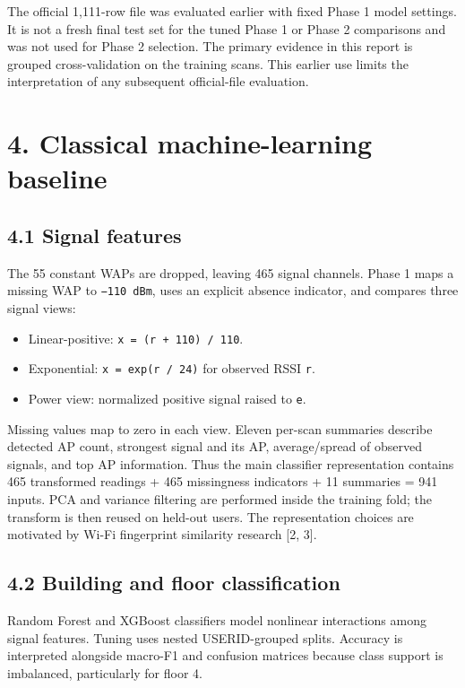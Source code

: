 \documentclass[
  10pt,
  a4paper,
]{article}
\providecommand{\tightlist}{%
  \setlength{\itemsep}{0pt}\setlength{\parskip}{0pt}}
\begin{document}
The official 1,111-row file was evaluated earlier with fixed Phase 1
model settings. It is not a fresh final test set for the tuned Phase 1
or Phase 2 comparisons and was not used for Phase 2 selection. The
primary evidence in this report is grouped cross-validation on the
training scans. This earlier use limits the interpretation of any
subsequent official-file evaluation.

\section{4. Classical machine-learning
baseline}\label{classical-machine-learning-baseline}

\subsection{4.1 Signal features}\label{signal-features}

The 55 constant WAPs are dropped, leaving 465 signal channels. Phase 1
maps a missing WAP to \texttt{−110\ dBm}, uses an explicit absence
indicator, and compares three signal views:

\begin{itemize}
\tightlist
\item
  Linear-positive: \texttt{x\ =\ (r\ +\ 110)\ /\ 110}.
\item
  Exponential: \texttt{x\ =\ exp(r\ /\ 24)} for observed RSSI
  \texttt{r}.
\item
  Power view: normalized positive signal raised to \texttt{e}.
\end{itemize}

Missing values map to zero in each view. Eleven per-scan summaries
describe detected AP count, strongest signal and its AP, average/spread
of observed signals, and top AP information. Thus the main classifier
representation contains 465 transformed readings + 465 missingness
indicators + 11 summaries = 941 inputs. PCA and variance filtering are
performed inside the training fold; the transform is then reused on
held-out users. The representation choices are motivated by Wi-Fi
fingerprint similarity research {[}2, 3{]}.

\subsection{4.2 Building and floor
classification}\label{building-and-floor-classification}

Random Forest and XGBoost classifiers model nonlinear interactions among
signal features. Tuning uses nested USERID-grouped splits. Accuracy is
interpreted alongside macro-F1 and confusion matrices because class
support is imbalanced, particularly for floor 4.
\end{document}
